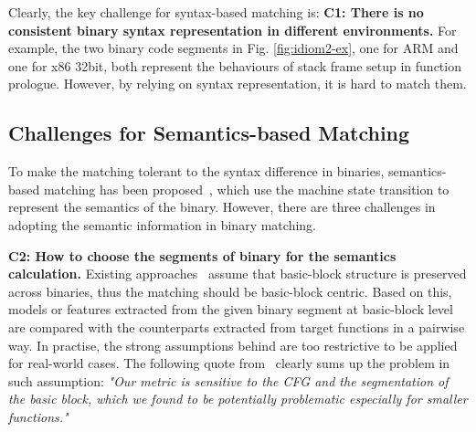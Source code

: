 Clearly, the key challenge for syntax-based matching is:
\noindent \textbf{C1: There is no consistent binary syntax representation in different environments.}
For example, the two binary code segments in Fig. \ref{fig:idiom2-ex}, one for ARM and one for x86 32bit,  both represent the behaviours of stack frame setup in function prologue. However, by relying on  syntax representation, it is hard to match them.


\subsection{Challenges for Semantics-based Matching} \label{subsec:sem_chall}

To make the matching tolerant to the syntax difference in binaries, semantics-based matching has been proposed~\cite{luo2014semantics,DBLP:conf/sp/PewnyGGRH15}, which use the machine state transition to represent the semantics of the binary. However, there are three challenges in adopting the semantic information in binary matching.

\textbf{C2: How to choose the segments of binary for the semantics calculation.}
Existing approaches~\cite{luo2014semantics,DBLP:conf/sp/PewnyGGRH15} assume that basic-block structure is preserved across binaries, thus the matching should be basic-block centric. Based on this, models or features extracted from the given binary segment at basic-block level are compared with the counterparts extracted from target functions in a pairwise way. In practise, the strong assumptions behind are too restrictive to be applied for real-world cases. The following quote from~\cite{DBLP:conf/sp/PewnyGGRH15} clearly sums up the problem in such assumption:
\emph{"Our metric is sensitive to the CFG and the segmentation of the basic block, which we found to be potentially problematic especially for smaller functions."}

